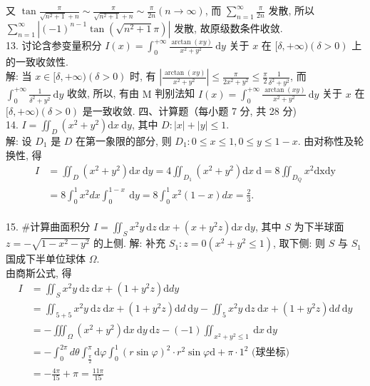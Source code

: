 \documentclass[a4paper,11pt,UTF8]{article}
\begin{document}
又 $\tan \frac{\pi}{\sqrt{n^2+1}+n} \sim \frac{\pi}{\sqrt{n^2+1}+n} \sim \frac{\pi}{2 n}(n \rightarrow \infty)$, 而 $\sum_{n=1}^{\infty} \frac{\pi}{2 n}$ 发散, 所以 $\sum_{n=1}^{\infty}\left|(-1)^{n-1} \tan \left(\sqrt{n^2+1} \pi\right)\right|$ 发散, 故原级数条件收敛.\\
13. 讨论含参变量积分 $I(x)=\int_0^{+\infty} \frac{\arctan (x y)}{x^2+y^2} \mathrm{~d} y$ 关于 $x$ 在 $[\delta,+\infty)(\delta>0)$ 上的一致收敛性.\\
解: 当 $x \in[\delta,+\infty)(\delta>0)$ 时, 有 $\left|\frac{\arctan (x y)}{x^2+y^2}\right| \leq \frac{\pi}{2 x^2+y^2} \leq \frac{\pi}{2} \frac{1}{\delta^2+y^2}$,
而 $\int_0^{+\infty} \frac{1}{\delta^2+y^2} \mathrm{~d} y$ 收敛, 所以, 有由 $\mathrm{M}$ 判别法知 $I(x)=\int_0^{+\infty} \frac{\arctan (x y)}{x^2+y^2} \mathrm{~d} y$ 关于 $x$ 在
$[\delta,+\infty)(\delta>0)$ 是一致收敛.
四、计算题（每小题 7 分, 共 28 分)\\
14. $I=\iint_D\left(x^2+y^2\right) \mathrm{d} x \mathrm{~d} y$, 其中 $D:|x|+|y| \leq 1$.\\
解: 设 $D_1$ 是 $D$ 在第一象限的部分, 则 $D_1: 0 \leq x \leq 1,0 \leq y \leq 1-x$.
由对称性及轮换性, 得
$$
\begin{aligned}
	I & =\iint_D\left(x^2+y^2\right) \mathrm{d} x \mathrm{~d} y=4 \iint_{D_1}\left(x^2+y^2\right) \mathrm{d} x \mathrm{~d}=8 \iint_{D_Q} x^2 \mathrm{dxdy} \\
	& =8 \int_0^1 x^2 d x \int_0^{1-x} \mathrm{~d} y=8 \int_0^1 x^2(1-x) d x=\frac{2}{3} .
\end{aligned}
$$\\
15. \#计算曲面积分 $I=\iint_S x^2 y \mathrm{~d} z \mathrm{~d} x+\left(x+y^2 z\right) \mathrm{d} x \mathrm{~d} y$, 其中 $S$ 为下半球面 $z=-\sqrt{1-x^2-y^2}$ 的上侧. 解: 补充 $S_1: z=0\left(x^2+y^2 \leq 1\right)$, 取下侧: 则 $S$ 与 $S_1$ 国成下半单位球体 $\Omega$.\\
由商斯公式, 得
$$
\begin{aligned}
	I & =\iint_S x^2 y \mathrm{~d} z \mathrm{~d} x+\left(1+y^2 z\right) \mathrm{d} d y \\
	& =\iint_{5+5} x^2 y \mathrm{~d} z \mathrm{~d} x+\left(1+y^2 z\right) \mathrm{d} d \mathrm{~d} y-\iint_5 x^2 y \mathrm{~d} z \mathrm{~d} x+\left(1+y^2 z\right) \mathrm{d} d \mathrm{~d} y \\
	& =-\iiint_{\Omega}\left(x^2+y^2\right) \mathrm{d} x \mathrm{~d} y \mathrm{~d} z-(-1) \iint_{x^2+y^2 \leq 1} \mathrm{~d} x \mathrm{~d} y \\
	& =-\int_0^{2 \pi} d \theta \int_{\frac{\pi}{2}}^\pi \mathrm{d} \varphi \int_0^1(r \sin \varphi)^2 \cdot r^2 \sin \varphi \mathrm{d}+\pi \cdot 1^2 \text { (球坐标) } \\
	& =-\frac{4 \pi}{15}+\pi=\frac{11 \pi}{15}
\end{aligned}
$$\\
\end{document}
